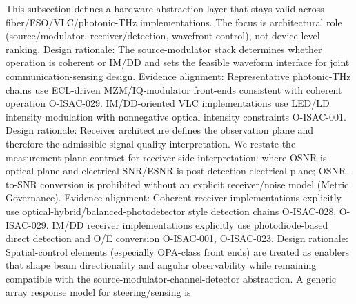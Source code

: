 {}This subsection defines a hardware abstraction layer that stays valid across fiber/FSO/VLC/photonic-THz implementations. The focus is architectural role (source/modulator, receiver/detection, wavefront control), not device-level ranking.\markdownRendererInterblockSeparator
{}\markdownRendererSectionBegin
{}\markdownRendererInterblockSeparator
{}Design rationale: The source-modulator stack determines whether operation is coherent or IM/DD and sets the feasible waveform interface for joint communication-sensing design.\markdownRendererParagraphSeparator
{}Evidence alignment: Representative photonic-THz chains use ECL-driven MZM/IQ-modulator front-ends consistent with coherent operation O-ISAC-029. IM/DD-oriented VLC implementations use LED/LD intensity modulation with nonnegative optical intensity constraints O-ISAC-001.\markdownRendererInterblockSeparator
{}
\markdownRendererSectionEnd \markdownRendererSectionBegin
{}\markdownRendererInterblockSeparator
{}Design rationale: Receiver architecture defines the observation plane and therefore the admissible signal-quality interpretation.\markdownRendererParagraphSeparator
{}We restate the measurement-plane contract for receiver-side interpretation:\markdownRendererSoftLineBreak
{}\markdownRendererSoftLineBreak
{}where OSNR is optical-plane and electrical SNR/ESNR is post-detection electrical-plane; OSNR-to-SNR conversion is prohibited without an explicit receiver/noise model (Metric Governance).\markdownRendererParagraphSeparator
{}Evidence alignment: Coherent receiver implementations explicitly use optical-hybrid/balanced-photodetector style detection chains O-ISAC-028, O-ISAC-029. IM/DD receiver implementations explicitly use photodiode-based direct detection and O/E conversion O-ISAC-001, O-ISAC-023.\markdownRendererInterblockSeparator
{}
\markdownRendererSectionEnd \markdownRendererSectionBegin
{}\markdownRendererInterblockSeparator
{}Design rationale: Spatial-control elements (especially OPA-class front ends) are treated as enablers that shape beam directionality and angular observability while remaining compatible with the source-modulator-channel-detector abstraction.\markdownRendererParagraphSeparator
{}A generic array response model for steering/sensing is\markdownRendererSoftLineBreak
{}\markdownRendererParagraphSeparator

